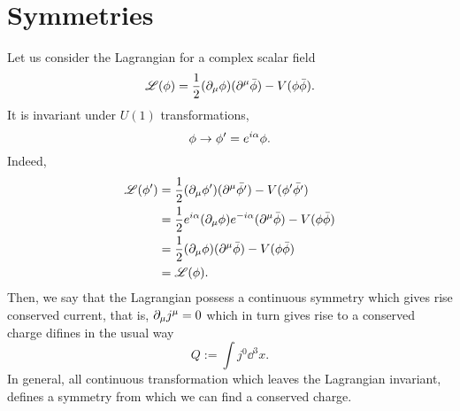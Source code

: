 \section{Symmetries}
Let us consider the Lagrangian for a complex scalar field
\begin{equation}
  \mathscr{L}(\phi )=\frac{1}{2}(\partial_\mu \phi )(\partial^\mu \bar{\phi })-V(\phi\bar{\phi }).
\end{equation}
It is invariant under $U(1)$ transformations, 
\begin{equation}
  \phi\to \phi' =e^{i\alpha }\phi .
\end{equation}
Indeed,
\begin{align}
  \mathscr{L}(\phi ')&=\frac{1}{2}(\partial_\mu \phi' )(\partial^\mu \bar{\phi' })-V(\phi'\bar{\phi' })\\
  &=\frac{1}{2}e^{i\alpha }(\partial_\mu \phi )e^{-i\alpha }(\partial^\mu \bar{\phi })-V(\phi\bar{\phi })\\
  &=\frac{1}{2}(\partial_\mu \phi )(\partial^\mu \bar{\phi })-V(\phi\bar{\phi })\\
  &=\mathscr{L} (\phi ).
\end{align}
Then, we say that the Lagrangian possess a continuous symmetry which gives rise conserved current, that is, $\partial_\mu j^\mu =0$ which in turn gives rise to a conserved charge difines in the usual way
\begin{equation}
  Q:=\int j^0 \dd^3x.
\end{equation}
In general, all continuous transformation which leaves the Lagrangian invariant, defines a symmetry from which we can find a conserved charge.




